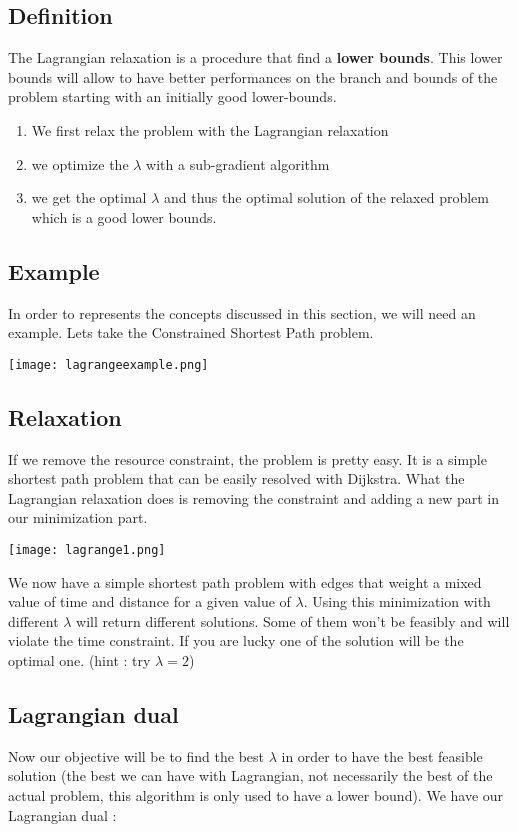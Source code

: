 \subsection{Definition}
The Lagrangian relaxation is a procedure that find a \textbf{lower
bounds}. This
lower bounds will allow to have better performances on the branch and
bounds of the problem starting with an initially good lower-bounds.

\begin{enumerate}
    \item We first relax the problem with the Lagrangian relaxation 
    \item we optimize the $\lambda$ with a sub-gradient algorithm 
        \item we get the optimal $\lambda$ and thus the optimal solution of the relaxed problem which is a good lower bounds.
        \end{enumerate}

\subsection{Example}
In order to represents the concepts discussed in this section, we will
need an example. Lets take the Constrained Shortest Path problem.

\centerline{\texttt{[image: lagrangeexample.png]}}

\subsection{Relaxation}
If we remove the resource constraint, the problem is pretty easy. It is
a simple shortest path problem that can be easily resolved with
Dijkstra. What the Lagrangian relaxation does is removing the constraint
and adding a new part in our minimization part.

\centerline{\texttt{[image: lagrange1.png]}}

We now have a simple shortest path problem with edges that weight a
mixed value of time and distance for a given value of $\lambda$. Using
this minimization with different $\lambda$ will return different
solutions. Some of them won't be feasibly and will violate the time
constraint. If you are lucky one of the solution will be the optimal
one. (hint : try $\lambda = 2$)

\subsection{Lagrangian dual}
Now our objective will be to find the best $\lambda$ in order to have the best feasible solution (the best we can have with Lagrangian, not necessarily the best of the actual problem, this algorithm is only used to have a lower bound). We have our Lagrangian dual : 


